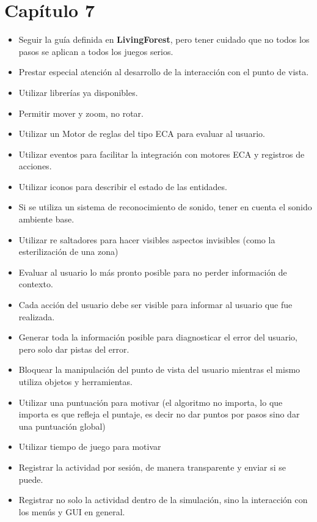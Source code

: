 \section{Capítulo 7}

\begin{itemize}

\item Seguir la guía definida en \textbf{LivingForest}, pero tener cuidado que no todos
    los pasos se aplican a todos los juegos serios.
\item Prestar especial atención al desarrollo de la interacción con el punto de
    vista.
  \item Utilizar librerías ya disponibles.
  \item Permitir mover y zoom, no rotar.
\item Utilizar un Motor de reglas del tipo ECA para evaluar al usuario.
\item Utilizar eventos para facilitar la integración con motores ECA y registros de
  acciones.
\item Utilizar iconos para describir el estado de las entidades.
\item Si se utiliza un sistema de reconocimiento de sonido, tener en cuenta el
  sonido ambiente base.
\item Utilizar re saltadores para hacer visibles aspectos invisibles (como la
  esterilización de una zona)
\item Evaluar al usuario lo más pronto posible para no perder información de
  contexto.
\item Cada acción del usuario debe ser visible para informar al usuario que fue
  realizada.
\item Generar toda la información posible para diagnosticar el error del usuario,
  pero solo dar pistas del error.
\item Bloquear la manipulación del punto de vista del usuario mientras el mismo
  utiliza objetos y herramientas.
\item Utilizar una puntuación para motivar (el algoritmo no importa, lo que importa
  es que refleja el puntaje, es decir no dar puntos por pasos sino dar una
  puntuación global)
\item Utilizar tiempo  de juego para motivar
\item Registrar la actividad por sesión, de manera transparente y enviar si se
  puede.
\item Registrar no solo la actividad dentro de la simulación, sino la interacción
  con los menús y GUI en general.
  

\end{itemize}

